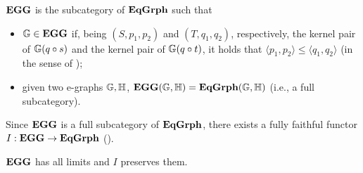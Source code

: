 \begin{definition}\label{def:cat_of_eggs}
    $\mathbf{EGG}$ is the subcategory of $\mathbf{EqGrph}$ such that
	\begin{itemize}
		\item $\mathbb{G} \in \mathbf{EGG}$ if, being $(S, p_1, p_2)$ and $(T, q_1, q_2)$, respectively, the kernel pair of $\mathbb{G}(q \circ s)$ and the kernel pair of $\mathbb{G}(q \circ t)$, it holds that $\langle p_1, p_2 \rangle \leq \langle q_1, q_2 \rangle$ (in the sense of );
		\item given two e-graphs $\mathbb{G, H}$, $\mathbf{EGG}(\mathbb{G, H}) =\mathbf{EqGrph}(\mathbb{G, H})$ (i.e., a full subcategory).
	\end{itemize}
\end{definition}

Since $\mathbf{EGG}$ is a full subcategory of $\mathbf{EqGrph}$, there exists a fully faithful functor $I: \mathbf{EGG} \to \mathbf{EqGrph}$ ().

\begin{lemma}
	$\mathbf{EGG}$ has all limits and $I$ preserves them.
\end{lemma}

